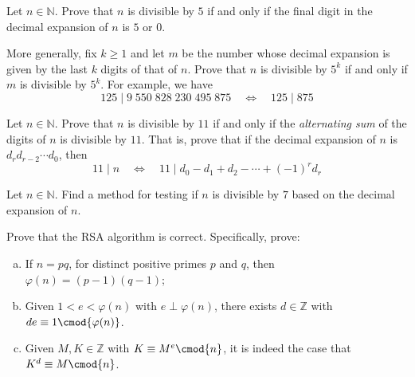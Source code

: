 \begin{exercise}
Let $n \in \mathbb{N}$. Prove that $n$ is divisible by $5$ if and only if the final digit in the decimal expansion of $n$ is $5$ or $0$.

More generally, fix $k \ge 1$ and let $m$ be the number whose decimal expansion is given by the last $k$ digits of that of $n$. Prove that $n$ is divisible by $5^k$ if and only if $m$ is divisible by $5^k$. For example, we have
\[ 125 \mid 9\;550\;828\;230\;495\;875 \quad \Leftrightarrow \quad 125 \mid 875 \]
\end{exercise}

\begin{exercise}
Let $n \in \mathbb{N}$. Prove that $n$ is divisible by $11$ if and only if the \textit{alternating sum} of the digits of $n$ is divisible by $11$. That is, prove that if the decimal expansion of $n$ is $d_rd_{r-2} \cdots d_0$, then
\[ 11 \mid n \quad \Leftrightarrow \quad 11 \mid d_0 - d_1 + d_2 - \cdots + (-1)^rd_r \]
\end{exercise}

\begin{exercise}
Let $n \in \mathbb{N}$. Find a method for testing if $n$ is divisible by $7$ based on the decimal expansion of $n$.
\end{exercise}


\begin{exercise}
Prove that the RSA algorithm is correct. Specifically, prove:
\begin{enumerate}[(a)]
\item If $n=pq$, for distinct positive primes $p$ and $q$, then $\varphi(n) = (p-1)(q-1)$;
\item Given $1<e<\varphi(n)$ with $e \perp \varphi(n)$, there exists $d \in \mathbb{Z}$ with $de \equiv 1 \cmod{\varphi(n)}$.
\item Given $M,K \in \mathbb{Z}$ with $K \equiv M^e \cmod{n}$, it is indeed the case that $K^d \equiv M \cmod{n}$.
\end{enumerate}
\end{exercise}
